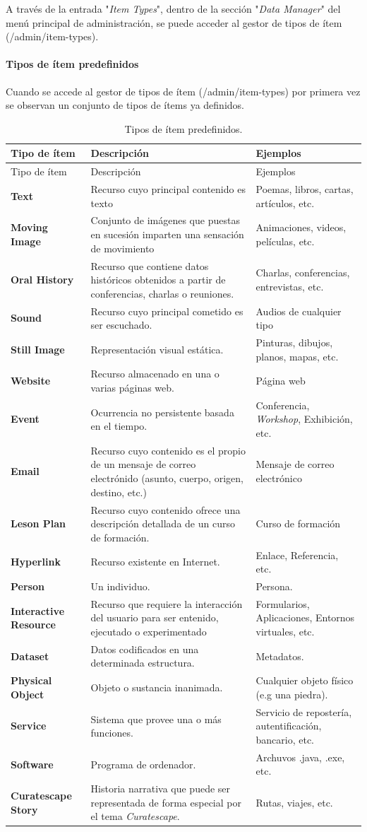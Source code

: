 \documentclass[
]{article}
\begin{document}
A través de la entrada "\emph{Item Types}", dentro de la sección
"\emph{Data Manager}" del menú principal de administración, se puede
acceder al gestor de tipos de ítem ({/admin/item-types}).

\hypertarget{tipos-de-uxedtem-predefinidos}{%
\paragraph{Tipos de ítem
predefinidos}\label{tipos-de-uxedtem-predefinidos}}

Cuando se accede al gestor de tipos de ítem ({/admin/item-types}) por
primera vez se observan un conjunto de tipos de ítems ya definidos.

\begin{longtable}[]{@{}lll@{}}
\caption{Tipos de ítem predefinidos.}\tabularnewline
\toprule
Tipo de ítem & Descripción & Ejemplos\tabularnewline
\midrule
\endfirsthead
\toprule
Tipo de ítem & Descripción & Ejemplos\tabularnewline
\midrule
\endhead
\textbf{Text} & Recurso cuyo principal contenido es texto & Poemas,
libros, cartas, artículos, etc.\tabularnewline
\textbf{Moving Image} & Conjunto de imágenes que puestas en sucesión
imparten una sensación de movimiento & Animaciones, videos, películas,
etc.\tabularnewline
\textbf{Oral History} & Recurso que contiene datos históricos obtenidos
a partir de conferencias, charlas o reuniones. & Charlas, conferencias,
entrevistas, etc.\tabularnewline
\textbf{Sound} & Recurso cuyo principal cometido es ser escuchado. &
Audios de cualquier tipo\tabularnewline
\textbf{Still Image} & Representación visual estática. & Pinturas,
dibujos, planos, mapas, etc.\tabularnewline
\textbf{Website} & Recurso almacenado en una o varias páginas web. &
Página web\tabularnewline
\textbf{Event} & Ocurrencia no persistente basada en el tiempo. &
Conferencia, \emph{Workshop}, Exhibición, etc.\tabularnewline
\textbf{Email} & Recurso cuyo contenido es el propio de un mensaje de
correo electrónido (asunto, cuerpo, origen, destino, etc.) & Mensaje de
correo electrónico\tabularnewline
\textbf{Leson Plan} & Recurso cuyo contenido ofrece una descripción
detallada de un curso de formación. & Curso de formación\tabularnewline
\textbf{Hyperlink} & Recurso existente en Internet. & Enlace,
Referencia, etc.\tabularnewline
\textbf{Person} & Un individuo. & Persona.\tabularnewline
\textbf{Interactive Resource} & Recurso que requiere la interacción del
usuario para ser entenido, ejecutado o experimentado & Formularios,
Aplicaciones, Entornos virtuales, etc.\tabularnewline
\textbf{Dataset} & Datos codificados en una determinada estructura. &
Metadatos.\tabularnewline
\textbf{Physical Object} & Objeto o sustancia inanimada. & Cualquier
objeto físico (e.g una piedra).\tabularnewline
\textbf{Service} & Sistema que provee una o más funciones. & Servicio de
repostería, autentificación, bancario, etc.\tabularnewline
\textbf{Software} & Programa de ordenador. & Archuvos .java, .exe,
etc.\tabularnewline
\textbf{Curatescape Story} & Historia narrativa que puede ser
representada de forma especial por el tema \emph{Curatescape}. & Rutas,
viajes, etc.\tabularnewline
\bottomrule
\end{longtable}
\end{document}
